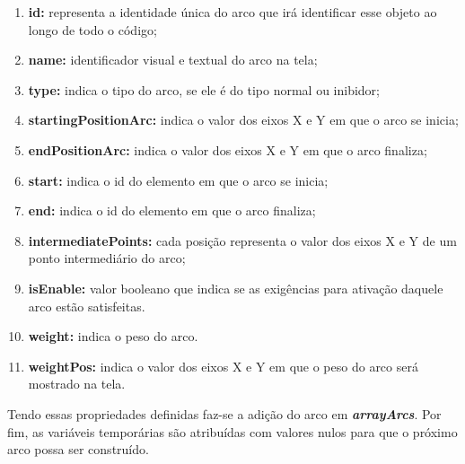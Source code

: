 \documentclass[
	12pt,				%
	openright,			%
	oneside,			%
	a4paper,			%
	english,			%
	brazil				%
	]{abntex2}
\begin{document}
\begin{enumerate}
	\item \textbf{id:} representa a identidade única do arco que irá identificar esse objeto ao longo de todo o código;
	\item \textbf{name:} identificador visual e textual do arco na tela;
	\item \textbf{type:} indica o tipo do arco, se ele é do tipo normal ou inibidor;
	\item \textbf{startingPositionArc:} indica o valor dos eixos X e Y em que o arco se inicia;
	\item \textbf{endPositionArc:} indica o valor dos eixos X e Y em que o arco finaliza;
	\item \textbf{start:} indica o id do elemento em que o arco se inicia;
	\item \textbf{end:} indica o id do elemento em que o arco finaliza;
	\item \textbf{intermediatePoints:} cada posição representa o valor dos eixos X e Y de um ponto intermediário do arco;
	\item \textbf{isEnable:} valor booleano que indica se as exigências para ativação daquele arco estão satisfeitas.
	\item \textbf{weight:} indica o peso do arco.
	\item \textbf{weightPos:} indica o valor dos eixos X e Y em que o peso do arco será mostrado na tela.
\end{enumerate}

Tendo essas propriedades definidas faz-se a adição do arco em \textbf{\textit{arrayArcs}}. Por fim, as variáveis temporárias são atribuídas com valores nulos para que o próximo arco possa ser construído.


\end{document}
